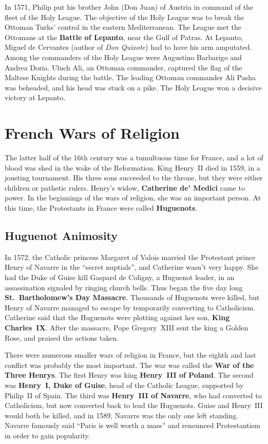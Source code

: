 In 1571, Philip put his brother John (Don Juan) of Austria in command of the fleet of the Holy League.
The objective of the Holy League was to break the Ottoman Turks' control in the eastern Mediterranean.
The League met the Ottomans at the \textbf{Battle of Lepanto}, near the Gulf of Patras.
At Lepanto, Miguel de Cervantes (author of \textit{Don Quixote}) had to have his arm amputated.
Among the commanders of the Holy League were Augustino Barbarigo and Andrea Doria.
Uluch Ali, an Ottoman commander, captured the flag of the Maltese Knights during the battle.
The leading Ottoman commander Ali Pasha was beheaded, and his head was stuck on a pike.
The Holy League won a decisive victory at Lepanto.

\section{French Wars of Religion}

The latter half of the 16th century was a tumultuous time for France,
and a lot of blood was shed in the wake of the Reformation.
King Henry~II died in 1559, in a jousting tournament.
His three sons succeeded to the throne, but they were either children or pathetic rulers.
Henry's widow, \textbf{Catherine de' Medici} came to power.
In the beginnings of the wars of religion, she was an important person.
At this time, the Protestants in France were called \textbf{Huguenots}.

\subsection*{Huguenot Animosity}

In 1572, the Catholic princess Margaret of Valois married
the Protestant prince Henry of Navarre in the ``secret nuptials'', and Catherine wasn't very happy.
She had the Duke of Guise kill Gaspard de Coligny, a Huguenot leader,
in an assassination signaled by ringing church bells.
Thus began the five day long \textbf{St.\ Bartholomew's Day Massacre}.
Thousands of Huguenots were killed, but Henry of Navarre managed to escape by temporarily converting to Catholicism.
Catherine said that the Huguenots were plotting against her son, \textbf{King Charles~IX}\@.
After the massacre, Pope Gregory~XIII sent the king a Golden Rose, and praised the actions taken.

There were numerous smaller wars of religion in France, but the eighth and last conflict was probably the most important.
The war was called the \textbf{War of the Three Henrys}.
The first Henry was king \textbf{Henry~III of Poland}.
The second was \textbf{Henry~I, Duke of Guise}, head of the Catholic League, supported by Philip~II of Spain.
The third was \textbf{Henry~III of Navarre}, who had converted to Catholicism,
but now converted back to lead the Huguenots.
Guise and Henry~III would both be killed, and in 1589, Navarre was the only one left standing.
Navarre famously said ``Paris is well worth a mass'' and renounced Protestantism in order to gain popularity.

